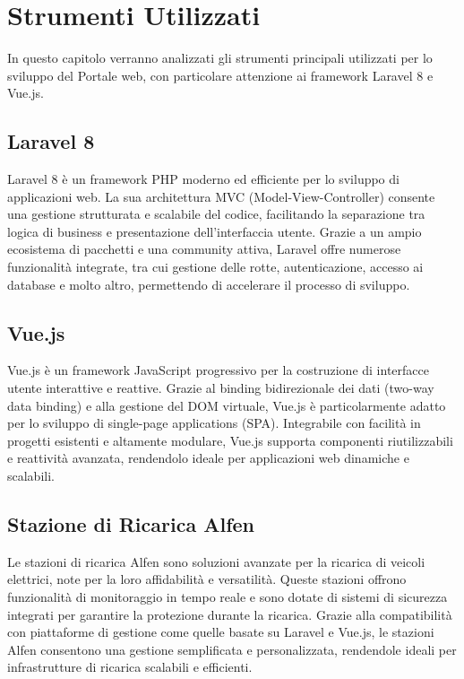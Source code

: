 \section*{Strumenti Utilizzati}
In questo capitolo verranno analizzati gli strumenti principali utilizzati per lo sviluppo del Portale web, con particolare attenzione ai framework Laravel 8 e Vue.js.

\subsection{Laravel 8}
Laravel 8 è un framework PHP moderno ed efficiente per lo sviluppo di applicazioni web. La sua architettura MVC (Model-View-Controller) consente una gestione strutturata e scalabile del codice, facilitando la separazione tra logica di business e presentazione dell’interfaccia utente. Grazie a un ampio ecosistema di pacchetti e una community attiva, Laravel offre numerose funzionalità integrate, tra cui gestione delle rotte, autenticazione, accesso ai database e molto altro, permettendo di accelerare il processo di sviluppo.

\subsection{Vue.js}
Vue.js è un framework JavaScript progressivo per la costruzione di interfacce utente interattive e reattive. Grazie al binding bidirezionale dei dati (two-way data binding) e alla gestione del DOM virtuale, Vue.js è particolarmente adatto per lo sviluppo di single-page applications (SPA). Integrabile con facilità in progetti esistenti e altamente modulare, Vue.js supporta componenti riutilizzabili e reattività avanzata, rendendolo ideale per applicazioni web dinamiche e scalabili.

\subsection{Stazione di Ricarica Alfen}
Le stazioni di ricarica Alfen sono soluzioni avanzate per la ricarica di veicoli elettrici, note per la loro affidabilità e versatilità. Queste stazioni offrono funzionalità di monitoraggio in tempo reale e sono dotate di sistemi di sicurezza integrati per garantire la protezione durante la ricarica. Grazie alla compatibilità con piattaforme di gestione come quelle basate su Laravel e Vue.js, le stazioni Alfen consentono una gestione semplificata e personalizzata, rendendole ideali per infrastrutture di ricarica scalabili e efficienti.\\

